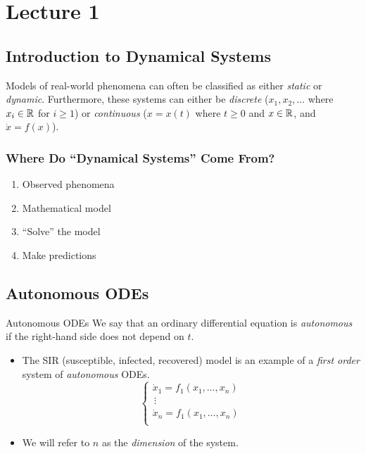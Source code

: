 \documentclass[class=article, crop=false]{standalone}
\begin{document}
  \section{Lecture 1}
  \subsection{Introduction to Dynamical Systems}
  Models of real-world phenomena can often be classified as either \emph{static} or \emph{dynamic}. Furthermore, these systems can either be \emph{discrete} ($x_1,x_2,\dotsc$ where $x_i\in\mathbb{R}$ for $i\geq 1$) or \emph{continuous} ($x = x(t)$ where $t\geq 0$ and $x\in\mathbb{R}$, and $\dot x = f(x)$).
  \subsubsection{Where Do ``Dynamical Systems'' Come From?}
  \begin{enumerate}
    \item Observed phenomena
    \item Mathematical model
    \item ``Solve'' the model
    \item Make predictions
  \end{enumerate}
  \subsection{Autonomous ODEs}
  \begin{definition}{Autonomous ODEs}
    We say that an ordinary differential equation is \emph{autonomous} if the right-hand side does not depend on $t$.
  \end{definition}
  \begin{itemize}
    \item The SIR (susceptible, infected, recovered) model is an example of a \emph{first order} system of \emph{autonomous} ODEs.
    \[
      \begin{cases}
        \dot x_1 = f_1(x_1,\dotsc,x_n) \\
        \hspace{2pt}\vdots \\
        \dot x_n = f_1(x_1,\dotsc,x_n) \\
      \end{cases}
    \]
    \item We will refer to $n$ as the \emph{dimension} of the system.
  \end{itemize}
\end{document}
